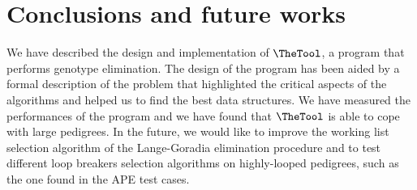 \section{Conclusions and future works}
\label{sec:concl-future-works}

We have described the design and implementation of {$\TheTool$}, a program that
performs genotype elimination. The design of the program has been aided by a
formal description of the problem that highlighted the critical aspects of the
algorithms and helped us to find the best data structures. We have measured the
performances of the program and we have found that {$\TheTool$} is able to cope
with large pedigrees. In the future, we would like to improve the working list
selection algorithm of the Lange-Goradia elimination procedure and to test
different loop breakers selection algorithms on highly-looped pedigrees, such
as the one found in the APE test cases.





